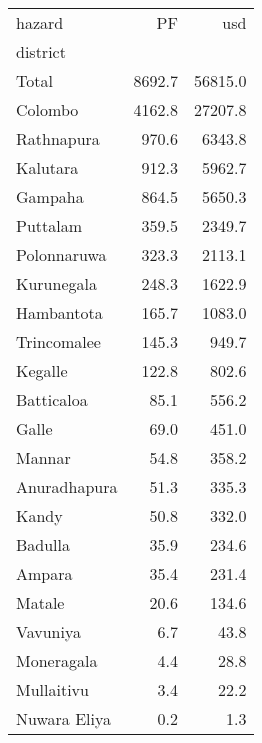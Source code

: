 \begin{tabular}{lrr}
\toprule
hazard &      PF &      usd \\
district     &         &          \\
\midrule
Total        &  8692.7 &  56815.0 \\
Colombo      &  4162.8 &  27207.8 \\
Rathnapura   &   970.6 &   6343.8 \\
Kalutara     &   912.3 &   5962.7 \\
Gampaha      &   864.5 &   5650.3 \\
Puttalam     &   359.5 &   2349.7 \\
Polonnaruwa  &   323.3 &   2113.1 \\
Kurunegala   &   248.3 &   1622.9 \\
Hambantota   &   165.7 &   1083.0 \\
Trincomalee  &   145.3 &    949.7 \\
Kegalle      &   122.8 &    802.6 \\
Batticaloa   &    85.1 &    556.2 \\
Galle        &    69.0 &    451.0 \\
Mannar       &    54.8 &    358.2 \\
Anuradhapura &    51.3 &    335.3 \\
Kandy        &    50.8 &    332.0 \\
Badulla      &    35.9 &    234.6 \\
Ampara       &    35.4 &    231.4 \\
Matale       &    20.6 &    134.6 \\
Vavuniya     &     6.7 &     43.8 \\
Moneragala   &     4.4 &     28.8 \\
Mullaitivu   &     3.4 &     22.2 \\
Nuwara Eliya &     0.2 &      1.3 \\
\bottomrule
\end{tabular}
